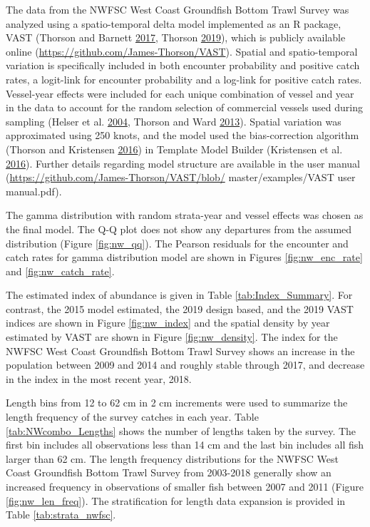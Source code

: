 \documentclass[12pt,]{article}
\begin{document}
The data from the NWFSC West Coast Groundfish Bottom Trawl Survey was
analyzed using a spatio-temporal delta model implemented as an R
package, VAST (Thorson and Barnett
\protect\hyperlink{ref-thorson_comparing_2017}{2017}, Thorson
\protect\hyperlink{ref-thorson_guidance_2019}{2019}), which is publicly
available online (\url{https://github.com/James-Thorson/VAST}). Spatial
and spatio-temporal variation is specifically included in both encounter
probability and positive catch rates, a logit-link for encounter
probability and a log-link for positive catch rates. Vessel-year effects
were included for each unique combination of vessel and year in the data
to account for the random selection of commercial vessels used during
sampling (Helser et al.
\protect\hyperlink{ref-helser_generalized_2004}{2004}, Thorson and Ward
\protect\hyperlink{ref-thorson_accounting_2013}{2013}). Spatial
variation was approximated using 250 knots, and the model used the
bias-correction algorithm (Thorson and Kristensen
\protect\hyperlink{ref-thorson_implementing_2016}{2016}) in Template
Model Builder (Kristensen et al.
\protect\hyperlink{ref-kristensen_tmb:_2016}{2016}). Further details
regarding model structure are available in the user manual
(\url{https://github.com/James-Thorson/VAST/blob/} master/examples/VAST
user manual.pdf).

The gamma distribution with random strata-year and vessel effects was
chosen as the final model. The Q-Q plot does not show any departures
from the assumed distribution (Figure \ref{fig:nw_qq}). The Pearson
residuals for the encounter and catch rates for gamma distribution model
are shown in Figures \ref{fig:nw_enc_rate} and \ref{fig:nw_catch_rate}.

The estimated index of abundance is given in Table
\ref{tab:Index_Summary}. For contrast, the 2015 model estimated, the
2019 design based, and the 2019 VAST indices are shown in Figure
\ref{fig:nw_index} and the spatial density by year estimated by VAST are
shown in Figure \ref{fig:nw_density}. The index for the NWFSC West Coast
Groundfish Bottom Trawl Survey shows an increase in the population
between 2009 and 2014 and roughly stable through 2017, and decrease in
the index in the most recent year, 2018.

Length bins from 12 to 62 cm in 2 cm increments were used to summarize
the length frequency of the survey catches in each year. Table
\ref{tab:NWcombo_Lengths} shows the number of lengths taken by the
survey. The first bin includes all observations less than 14 cm and the
last bin includes all fish larger than 62 cm. The length frequency
distributions for the NWFSC West Coast Groundfish Bottom Trawl Survey
from 2003-2018 generally show an increased frequency in observations of
smaller fish between 2007 and 2011 (Figure \ref{fig:nw_len_freq}). The
stratification for length data expansion is provided in Table
\ref{tab:strata_nwfsc}.
\end{document}

